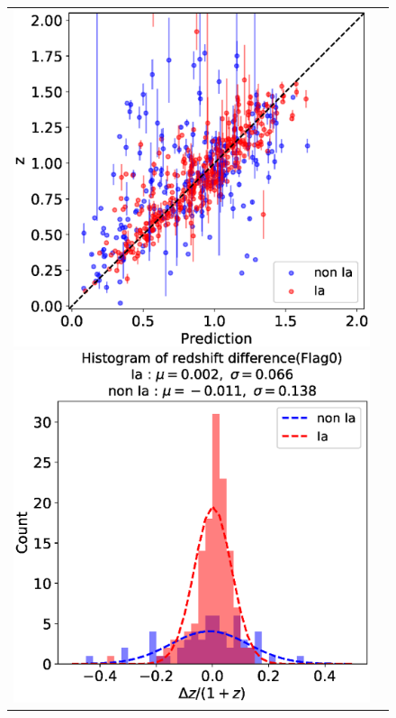 \documentclass[useamsfonts]{pasj01}
\begin{document}
\begin{figure}[ht]
    \begin{tabular}{cc}
        \begin{minipage}{0.5\hsize}
            \begin{center}
                \includegraphics[width=\columnwidth]{figures/redshift_pred_Ia_w_true_label_flagall.eps}
            \end{center}
        \end{minipage}
        \begin{minipage}{0.5\hsize}
            \begin{center}
                \includegraphics[width=\columnwidth]{figures/redshift_pred_Ia_w_true_label_diff_flag0.eps}

\end{center}
\end{minipage}
\end{tabular}
\end{figure}
\end{document}
